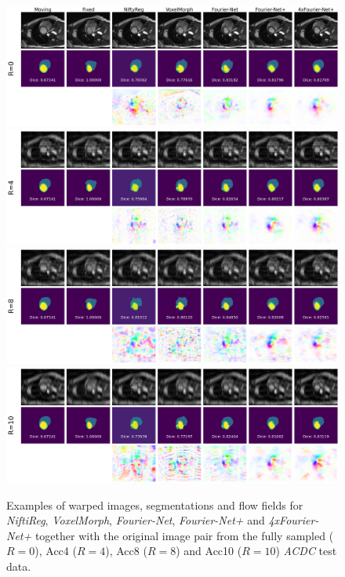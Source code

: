 \documentclass[english,version-2022-01]{uzl-thesis} %
\begin{document}
\begin{figure}[htpb]
	\centering
	\graphicspath{{images/}{\main/images/}}
	\includegraphics[width=\textwidth]{TestExamples_Mode0.png}
    	\includegraphics[width=\textwidth]{TestExamples_Mode1.png}
    	\includegraphics[width=\textwidth]{TestExamples_Mode2.png}
    	\includegraphics[width=\textwidth]{TestExamples_Mode3.png}	
	\caption{Examples of warped images, segmentations and flow fields for \emph{NiftiReg}, \emph{VoxelMorph}, \emph{Fourier-Net}, \emph{Fourier-Net+} and \emph{4xFourier-Net+} together with the original image pair from the fully sampled ($R=0$), Acc4 ($R=4$), Acc8 ($R=8$) and Acc10 ($R=10$) \emph{ACDC} test data.}
	\label{fig:TestExamples}
\end{figure}
\end{document}
